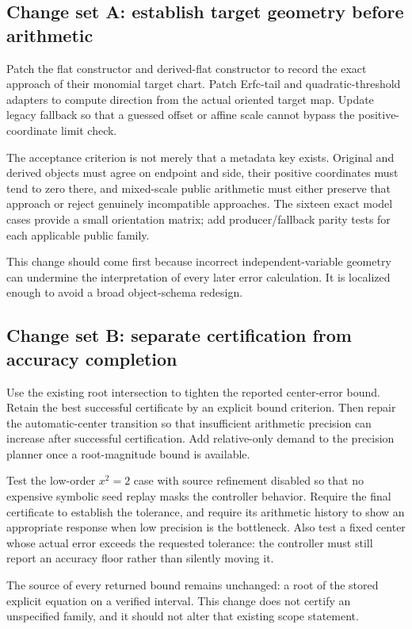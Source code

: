 \subsection{Change set A: establish target geometry before arithmetic}

Patch the flat constructor and derived-flat constructor to record the exact approach of their monomial target chart. Patch Erfc-tail and quadratic-threshold adapters to compute direction from the actual oriented target map. Update legacy fallback so that a guessed offset or affine scale cannot bypass the positive-coordinate limit check.

The acceptance criterion is not merely that a metadata key exists. Original and derived objects must agree on endpoint and side, their positive coordinates must tend to zero there, and mixed-scale public arithmetic must either preserve that approach or reject genuinely incompatible approaches. The sixteen exact model cases provide a small orientation matrix; add producer/fallback parity tests for each applicable public family.

This change should come first because incorrect independent-variable geometry can undermine the interpretation of every later error calculation. It is localized enough to avoid a broad object-schema redesign.

\subsection{Change set B: separate certification from accuracy completion}

Use the existing root intersection to tighten the reported center-error bound. Retain the best successful certificate by an explicit bound criterion. Then repair the automatic-center transition so that insufficient arithmetic precision can increase after successful certification. Add relative-only demand to the precision planner once a root-magnitude bound is available.

Test the low-order $x^2=2$ case with source refinement disabled so that no expensive symbolic seed replay masks the controller behavior. Require the final certificate to establish the tolerance, and require its arithmetic history to show an appropriate response when low precision is the bottleneck. Also test a fixed center whose actual error exceeds the requested tolerance: the controller must still report an accuracy floor rather than silently moving it.

The source of every returned bound remains unchanged: a root of the stored explicit equation on a verified interval. This change does not certify an unspecified  family, and it should not alter that existing scope statement.\cite{cert}


